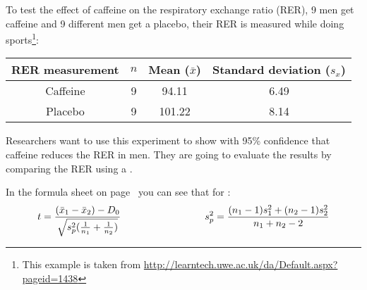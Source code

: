 \setcounter{chapter}{5}
\setcounter{section}{3}
\setcounter{question}{0}



To test the effect of caffeine on the respiratory exchange ratio (RER), 9 men get caffeine and 9 different men get a placebo, their RER is measured while doing sports\footnote{This example is taken from \url{http://learntech.uwe.ac.uk/da/Default.aspx?pageid=1438}}: \\
\vspace*{0.5cm}
\begin{center}
\begin{tabular}{c|ccc}
RER measurement & $n$ & Mean ($\bar{x}$) & Standard deviation ($s_x$) \tstrut\bstrut\\
\hline
Caffeine & 9 & 94.11 & 6.49 \tstrut\bstrut\\
Placebo & 9 & 101.22 & 8.14 \tstrut\bstrut\\
\end{tabular}
\end{center}
\vspace*{0.5cm}

Researchers want to use this experiment to show with 95\% confidence that caffeine reduces the RER in men. They are going to evaluate the results by comparing the  RER using a . \\


\twolineanswerbox


\hypothesesbox

In the formula sheet on page~\pageref{formulasheet} you can see that for :
\vspace*{0.5cm}
\begin{equation*}
    t = \frac{(\bar{x}_1 - \bar{x}_2) - D_0}{\sqrt{s^2_p (\frac{1}{n_1} + \frac{1}{n_2})}}
    \hspace*{3cm}
    s^2_p = \frac{(n_1 - 1) s^2_1 + (n_2 - 1) s^2_2}{n_1 + n_2 - 2}
\end{equation*}
\vspace*{0.5cm}

